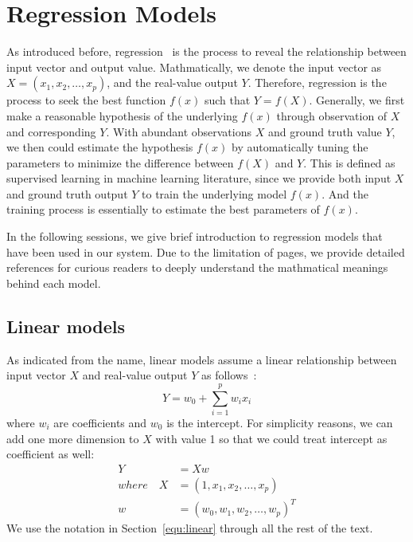 \section{Regression Models}
\label{sec:method}
As introduced before, regression~\cite{hastie2009elements} is the process to reveal the relationship between input vector and output value.
Mathmatically, we denote the input vector as $X = (x_1, x_2, \ldots, x_p)$, and the real-value output $Y$.
Therefore, regression is the process to seek the best function $f(x)$ such that $Y = f(X)$.
Generally, we first make a reasonable hypothesis of the underlying $f(x)$ through observation of $X$ and corresponding $Y$.
With abundant observations $X$ and ground truth value $Y$, we then could estimate the hypothesis $f(x)$ by automatically tuning the parameters to minimize the difference between $f(X)$ and $Y$.
This is defined as supervised learning in machine learning literature, since we provide both input $X$ and ground truth output $Y$ to train the underlying model $f(x)$.
And the training process is essentially to estimate the best parameters of $f(x)$.

In the following sessions, we give brief introduction to regression models that have been used in our system.
Due to the limitation of pages, we provide detailed references for curious readers to deeply understand the mathmatical meanings behind each model.

\subsection{Linear models}
\label{sub:linear_models}
As indicated from the name, linear models assume a linear relationship between input vector $X$ and real-value output $Y$ as follows~\cite{hastie2009elements}:
\begin{equation}
	Y = w_0 + \sum\limits_{i=1}^p w_i{x_i}
\end{equation}
where $w_i$ are coefficients and $w_0$ is the intercept. For simplicity reasons, we can add one more dimension to $X$ with value 1 so that we could treat intercept as coefficient as well:
\begin{equation}
	\label{equ:linear}
	\begin{aligned}
		Y &= Xw \\
		where \quad X &= (1, x_1, x_2, \ldots, x_p) \\
		w &= {(w_0, w_1, w_2, \ldots, w_p)}^T
	\end{aligned}
\end{equation}
We use the notation in Section~\ref{equ:linear} through all the rest of the text.

